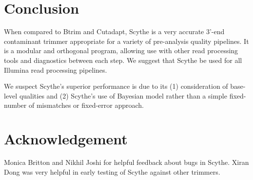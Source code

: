\documentclass{bioinfo}
\begin{document}
\begin{methods}
\end{methods}

\section{Conclusion}

When compared to Btrim and Cutadapt, Scythe is a very accurate 3'-end
contaminant trimmer appropriate for a variety of pre-analysis quality
pipelines. It is a modular and orthogonal program, allowing use with
other read processing tools and diagnostics between each step. We
suggest that Scythe be used for all Illumina read processing
pipelines.

We suspect Scythe's superior performance is due to its (1)
consideration of base-level qualities and (2) Scythe's use of Bayesian
model rather than a simple fixed-number of mismatches or fixed-error
approach.


\section*{Acknowledgement}
Monica Britton and Nikhil Joshi for helpful feedback about bugs in
Scythe. Xiran Dong was very helpful in early testing of Scythe against
other trimmers.




% 
% 
% 
% 
\nocite{qrqc}
\nocite{ShortRead}
\nocite{Biostrings}
\nocite{ggplot2}


\end{document}
